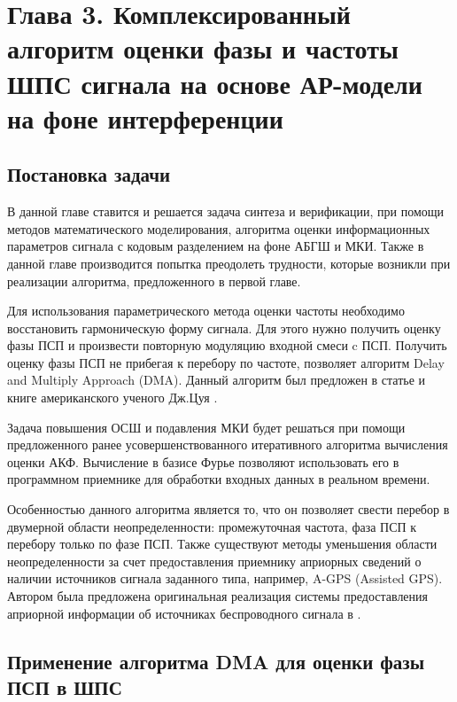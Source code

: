 \setcounter{chapter}{3}
\setcounter{section}{0}
\setcounter{equation}{0}
\setcounter{figure}{0}
\chapter*{Глава 3. Комплексированный алгоритм оценки фазы и частоты ШПС сигнала на основе АР-модели на фоне интерференции}
\section{Постановка задачи}
В данной главе ставится и решается задача синтеза и верификации, при помощи методов математического моделирования, алгоритма оценки информационных параметров
сигнала с кодовым разделением на фоне АБГШ и МКИ. Также в данной главе производится попытка преодолеть трудности, которые возникли при реализации алгоритма,
предложенного в первой главе.

Для использования параметрического метода оценки частоты необходимо восстановить гармоническую форму сигнала. Для этого
нужно получить оценку фазы ПСП и произвести повторную модуляцию входной смеси c ПСП. Получить оценку фазы ПСП не прибегая к перебору по частоте,
позволяет алгоритм Delay and Multiply Approach (DMA). Данный алгоритм был предложен в статье и книге американского ученого Дж.Цуя \cite{lin_dma, tsui}.

Задача повышения ОСШ и подавления МКИ будет решаться при помощи предложенного ранее усовершенствованного итеративного алгоритма вычисления оценки АКФ.
Вычисление в базисе Фурье позволяют использовать его в программном приемнике для обработки входных данных в реальном времени.

Особенностью данного алгоритма является то, что он позволяет свести перебор в двумерной области неопределенности:
промежуточная частота, фаза ПСП к перебору только по фазе ПСП. Также существуют методы уменьшения области неопределенности за счет предоставления
приемнику априорных сведений о наличии источников сигнала заданного типа, например, A-GPS (Assisted GPS). Автором была предложена оригинальная
реализация системы предоставления априорной информации об источниках беспроводного сигнала в \cite{nikiforov-patent}.

\section{Применение алгоритма DMA для оценки фазы ПСП в ШПС}
\label{sec_dma_real}


